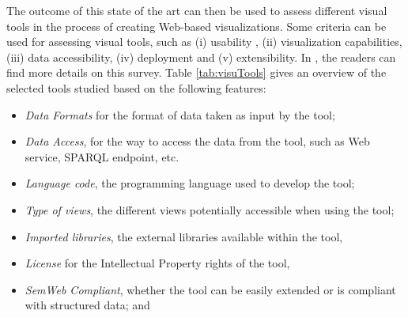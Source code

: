 The outcome of this state of the art can then be used to assess different visual tools in the process of creating Web-based visualizations. Some criteria can be used for assessing visual tools, such as (i) usability , (ii) visualization capabilities, (iii) data accessibility, (iv) deployment and (v) extensibility. In \cite{deliverable2012b}, the readers can find more details on this survey. Table \ref{tab:visuTools} gives an overview of the selected tools studied based on the following features:
\begin{itemize}
\item \textit{Data Formats} for the format of data taken as input by the tool;
\item \textit{Data Access}, for the way to access the data from the tool, such as Web service, SPARQL endpoint, etc.
\item \textit{Language code}, the programming language used to develop the tool;
\item \textit{Type of views}, the different views potentially accessible when using the tool;
\item \textit{Imported libraries}, the external libraries available within the tool,
\item \textit{License} for the Intellectual Property rights of the tool,
\item \textit{SemWeb Compliant}, whether the tool can be easily extended or is compliant with structured data; and

\end{itemize}


